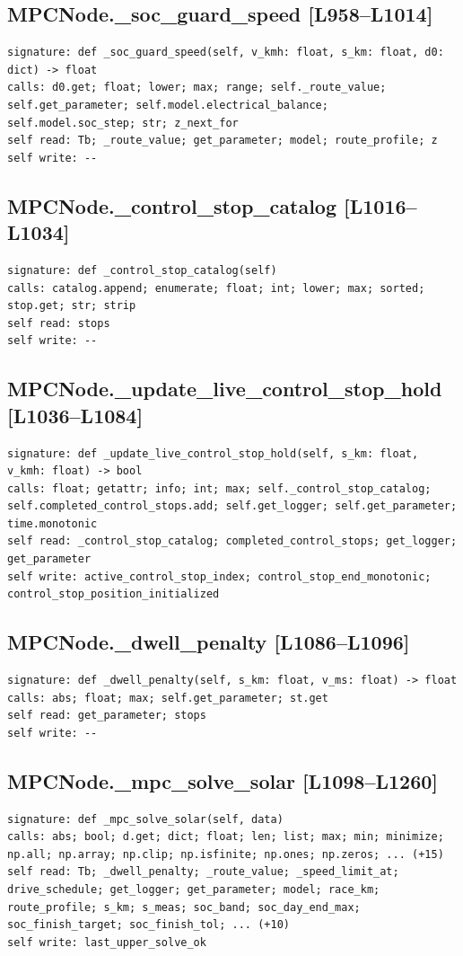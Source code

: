 \documentclass[a4paper,10pt,oneside]{book}
\begin{document}
\subsection*{MPCNode.\_soc\_guard\_speed [L958--L1014]}
\begin{lstlisting}[numbers=none]
signature: def _soc_guard_speed(self, v_kmh: float, s_km: float, d0: dict) -> float
calls: d0.get; float; lower; max; range; self._route_value; self.get_parameter; self.model.electrical_balance; self.model.soc_step; str; z_next_for
self read: Tb; _route_value; get_parameter; model; route_profile; z
self write: --
\end{lstlisting}
\subsection*{MPCNode.\_control\_stop\_catalog [L1016--L1034]}
\begin{lstlisting}[numbers=none]
signature: def _control_stop_catalog(self)
calls: catalog.append; enumerate; float; int; lower; max; sorted; stop.get; str; strip
self read: stops
self write: --
\end{lstlisting}
\subsection*{MPCNode.\_update\_live\_control\_stop\_hold [L1036--L1084]}
\begin{lstlisting}[numbers=none]
signature: def _update_live_control_stop_hold(self, s_km: float, v_kmh: float) -> bool
calls: float; getattr; info; int; max; self._control_stop_catalog; self.completed_control_stops.add; self.get_logger; self.get_parameter; time.monotonic
self read: _control_stop_catalog; completed_control_stops; get_logger; get_parameter
self write: active_control_stop_index; control_stop_end_monotonic; control_stop_position_initialized
\end{lstlisting}
\subsection*{MPCNode.\_dwell\_penalty [L1086--L1096]}
\begin{lstlisting}[numbers=none]
signature: def _dwell_penalty(self, s_km: float, v_ms: float) -> float
calls: abs; float; max; self.get_parameter; st.get
self read: get_parameter; stops
self write: --
\end{lstlisting}
\subsection*{MPCNode.\_mpc\_solve\_solar [L1098--L1260]}
\begin{lstlisting}[numbers=none]
signature: def _mpc_solve_solar(self, data)
calls: abs; bool; d.get; dict; float; len; list; max; min; minimize; np.all; np.array; np.clip; np.isfinite; np.ones; np.zeros; ... (+15)
self read: Tb; _dwell_penalty; _route_value; _speed_limit_at; drive_schedule; get_logger; get_parameter; model; race_km; route_profile; s_km; s_meas; soc_band; soc_day_end_max; soc_finish_target; soc_finish_tol; ... (+10)
self write: last_upper_solve_ok
\end{lstlisting}
\end{document}
